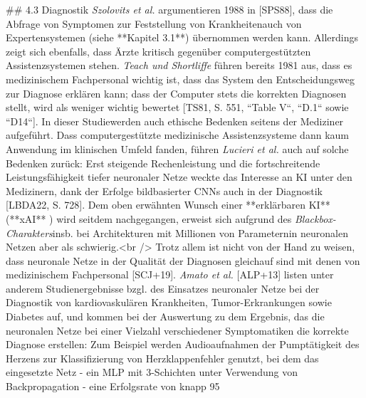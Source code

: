 ## 4.3 Diagnostik
\textit{Szolovits et al.} argumentieren 1988 in [SPS88], dass die Abfrage von Symptomen zur Feststellung von Krankheiten\footnotemark[14] auch von Expertensystemen (siehe **Kapitel 3.1**) übernommen werden kann. Allerdings zeigt sich ebenfalls, dass Ärzte kritisch gegenüber computergestützten Assistenzsystemen stehen. \textit{Teach und Shortliffe} führen bereits 1981 aus, dass es medizinischem Fachpersonal wichtig ist, dass das System den Entscheidungsweg zur Diagnose erklären kann; dass der Computer stets die korrekten Diagnosen stellt, wird als weniger wichtig bewertet [TS81, S. 551, ``Table V``, ``D.1`` sowie ``D14``]. In dieser Studie\footnotemark[15] werden auch ethische Bedenken seitens der Mediziner aufgeführt. Dass computergestützte medizinische Assistenzsysteme dann kaum Anwendung im klinischen Umfeld fanden, führen \textit{Lucieri et al.} auch auf solche Bedenken zurück: Erst steigende Rechenleistung und die fortschreitende Leistungsfähigkeit tiefer neuronaler Netze weckte das Interesse an KI unter den Medizinern, dank der Erfolge bildbasierter CNNs auch in der Diagnostik [LBDA22, S. 728]. Dem oben erwähnten Wunsch einer **erklärbaren KI** (**xAI** \footnotemark[16]) wird seitdem nachgegangen, erweist sich aufgrund des \textit{Blackbox-Charakters}\footnotemark[17] insb. bei Architekturen mit Millionen von Parametern\footnotemark[18] in neuronalen Netzen aber als schwierig\footnotemark[19].<br />
Trotz allem ist nicht von der Hand zu weisen, dass neuronale Netze in der Qualität der Diagnosen gleichauf sind mit denen von medizinischem Fachpersonal [SCJ+19]. \textit{Amato et al.} [ALP+13] listen unter anderem Studienergebnisse bzgl. des Einsatzes neuronaler Netze bei der Diagnostik von kardiovaskulären Krankheiten, Tumor-Erkrankungen sowie Diabetes auf, und kommen bei der Auswertung zu dem Ergebnis, das die neuronalen Netze bei einer Vielzahl verschiedener Symptomatiken die korrekte Diagnose erstellen: Zum Beispiel werden Audioaufnahmen der Pumptätigkeit des Herzens zur Klassifizierung von Herzklappenfehler genutzt, bei dem das eingesetzte Netz - ein MLP mit 3-Schichten unter Verwendung von Backpropagation - eine Erfolgsrate von knapp 95%
